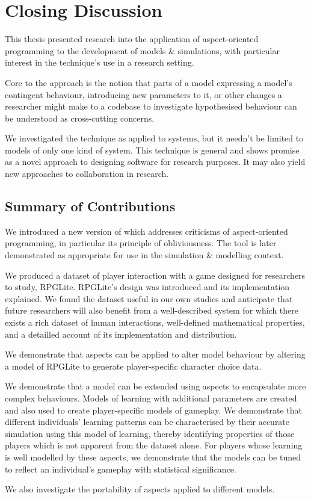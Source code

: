 \chapter{Closing Discussion}\label{chap:closing_discussion}


This thesis presented research into the application of aspect-oriented
programming to the development of models \& simulations, with particular
interest in the technique's use in a research setting. 

Core to the approach is the notion that parts of a model expressing a model's
contingent behaviour, introducing new parameters to it, or other changes a
researcher might make to a codebase to investigate hypothesised behaviour can be
understood as cross-cutting concerns.

We investigated the technique as applied to \sociotechnical systems, but it
needn't be limited to models of only one kind of system. This technique is
general and shows promise as a novel approach to designing software for research
purposes. It may also yield new approaches to collaboration in research.





\section{Summary of Contributions}

We introduced a new version of \pdsf which addresses criticisms of
aspect-oriented programming, in particular its principle of obliviousness. The
tool is later demonstrated as appropriate for use in the simulation \& modelling
context.

We produced a dataset of player interaction with a game designed for researchers
to study, RPGLite. RPGLite's design was introduced and its implementation
explained. We found the dataset useful in our own studies and anticipate that
future researchers will also benefit from a well-described \sociotechnical
system for which there exists a rich dataset of human interactions, well-defined
mathematical properties, and a detailled account of its implementation and
distribution.

We demonstrate that aspects can be applied to alter model behaviour by
altering a model of RPGLite to generate player-specific character choice data.

We demonstrate that a model can be extended using aspects to encapsulate more
complex behaviours. Models of learning with additional parameters are created
and also used to create player-specific models of gameplay. We demonstrate that
different individuals' learning patterns can be characterised by their accurate
simulation using this model of learning, thereby identifying properties of those
players which is not apparent from the dataset alone. For players whose learning
is well modelled by these aspects, we demonstrate that the models can be tuned
to reflect an individual's gameplay with statistical significance.

We also investigate the portability of aspects applied to different models.






